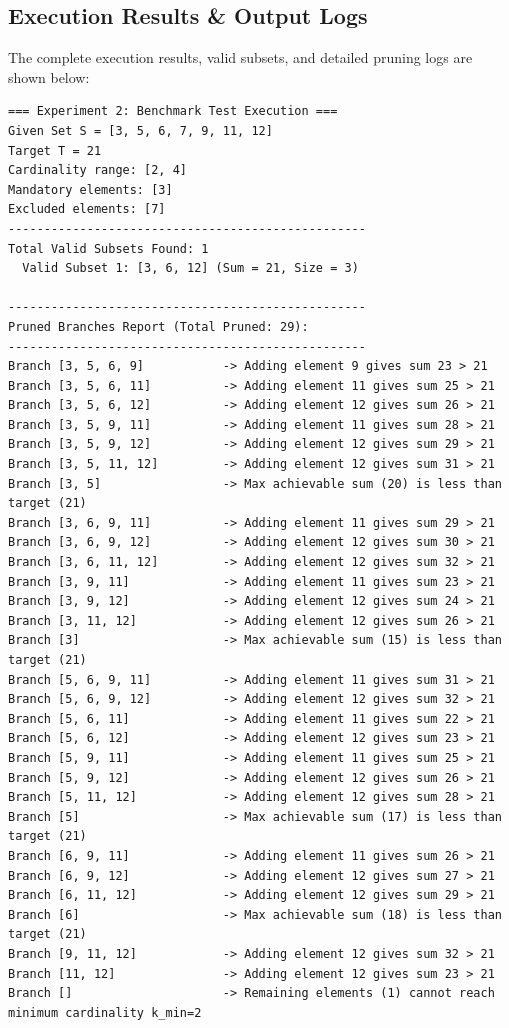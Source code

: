 \documentclass[12pt]{article}
\begin{document}
\subsection{Execution Results \& Output Logs}
The complete execution results, valid subsets, and detailed pruning logs are shown below:

\begin{lstlisting}[style=output]
=== Experiment 2: Benchmark Test Execution ===
Given Set S = [3, 5, 6, 7, 9, 11, 12]
Target T = 21
Cardinality range: [2, 4]
Mandatory elements: [3]
Excluded elements: [7]
--------------------------------------------------
Total Valid Subsets Found: 1
  Valid Subset 1: [3, 6, 12] (Sum = 21, Size = 3)

--------------------------------------------------
Pruned Branches Report (Total Pruned: 29):
--------------------------------------------------
Branch [3, 5, 6, 9]           -> Adding element 9 gives sum 23 > 21
Branch [3, 5, 6, 11]          -> Adding element 11 gives sum 25 > 21
Branch [3, 5, 6, 12]          -> Adding element 12 gives sum 26 > 21
Branch [3, 5, 9, 11]          -> Adding element 11 gives sum 28 > 21
Branch [3, 5, 9, 12]          -> Adding element 12 gives sum 29 > 21
Branch [3, 5, 11, 12]         -> Adding element 12 gives sum 31 > 21
Branch [3, 5]                 -> Max achievable sum (20) is less than target (21)
Branch [3, 6, 9, 11]          -> Adding element 11 gives sum 29 > 21
Branch [3, 6, 9, 12]          -> Adding element 12 gives sum 30 > 21
Branch [3, 6, 11, 12]         -> Adding element 12 gives sum 32 > 21
Branch [3, 9, 11]             -> Adding element 11 gives sum 23 > 21
Branch [3, 9, 12]             -> Adding element 12 gives sum 24 > 21
Branch [3, 11, 12]            -> Adding element 12 gives sum 26 > 21
Branch [3]                    -> Max achievable sum (15) is less than target (21)
Branch [5, 6, 9, 11]          -> Adding element 11 gives sum 31 > 21
Branch [5, 6, 9, 12]          -> Adding element 12 gives sum 32 > 21
Branch [5, 6, 11]             -> Adding element 11 gives sum 22 > 21
Branch [5, 6, 12]             -> Adding element 12 gives sum 23 > 21
Branch [5, 9, 11]             -> Adding element 11 gives sum 25 > 21
Branch [5, 9, 12]             -> Adding element 12 gives sum 26 > 21
Branch [5, 11, 12]            -> Adding element 12 gives sum 28 > 21
Branch [5]                    -> Max achievable sum (17) is less than target (21)
Branch [6, 9, 11]             -> Adding element 11 gives sum 26 > 21
Branch [6, 9, 12]             -> Adding element 12 gives sum 27 > 21
Branch [6, 11, 12]            -> Adding element 12 gives sum 29 > 21
Branch [6]                    -> Max achievable sum (18) is less than target (21)
Branch [9, 11, 12]            -> Adding element 12 gives sum 32 > 21
Branch [11, 12]               -> Adding element 12 gives sum 23 > 21
Branch []                     -> Remaining elements (1) cannot reach minimum cardinality k_min=2

\end{lstlisting}
\end{document}
